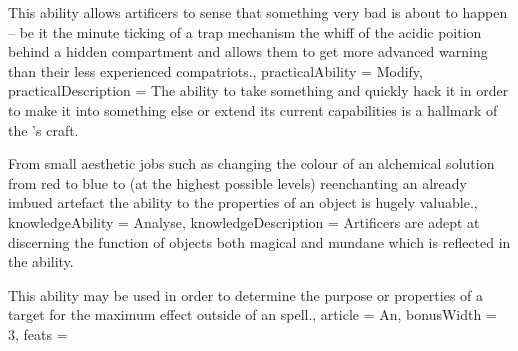 {This ability allows artificers to sense that something very bad is about to happen – be it the minute ticking of a trap mechanism\comma{} the whiff of the acidic poition behind a hidden compartment\comma{} and allows them to get more advanced warning than their less experienced compatriots.,
	practicalAbility = Modify,
	practicalDescription = The ability to take something and quickly hack it in order to make it into something else\comma{} or extend its current capabilities\comma{} is a hallmark of the \bname{}’s craft. 

From small aesthetic jobs\comma{} such as changing the colour of an alchemical solution from red to blue\comma{} to (at the highest possible levels)\comma{} re\minus{}enchanting an already imbued artefact\comma{} the ability to  the properties of an object is hugely valuable.,
	knowledgeAbility = Analyse,
	knowledgeDescription = Artificers are adept at discerning the function of objects\comma{} both magical and mundane\comma{} which is reflected in the  ability. 

This ability may be used in order to determine the purpose or properties of a target for the maximum effect outside of an  spell.,
	article = An,
	bonusWidth = 3, feats = \ArtificerFeats
}

